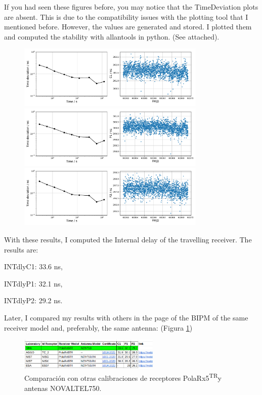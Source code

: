 \documentclass[11pt]{article}
\newcommand{\polar}[0]{PolaRx5\textsuperscript{TR}}
\begin{document}
If you had seen these figures before,  you may notice that the TimeDeviation plots are absent. This is due to the compatibility issues with the plotting tool that I mentioned before. However, the values are generated and stored. I plotted them and computed the stability with allantools in python. (See attached).

\begin{figure}[ht]
    \begin{center}
        \includegraphics[width=0.8\textwidth]{./figuras/C1.pdf}
        \includegraphics[width=0.8\textwidth]{./figuras/P1.pdf}
        \includegraphics[width=0.8\textwidth]{./figuras/P2.pdf}
    \end{center}
\end{figure}



With these results, I computed the Internal delay of the travelling receiver. The results are: 

INTdlyC1: 33.6 ns, 

INTdlyP1: 32.1 ns, 

INTdlyP2: 29.2 ns. 

Later, I compared my results with others in the page of the BIPM of the same receiver model and, preferably,  the same antenna: (Figura \ref{fig:comparaciondelays})



\begin{figure}[ht]
    \begin{center}
        \includegraphics[width=0.6\textwidth]{./figuras/comparacionesBIPM.png}
        \caption{Comparación con otras calibraciones de receptores \polar y antenas NOVALTEL750.}
        \label{fig:comparaciondelays}
    \end{center}
\end{figure}
\end{document}
